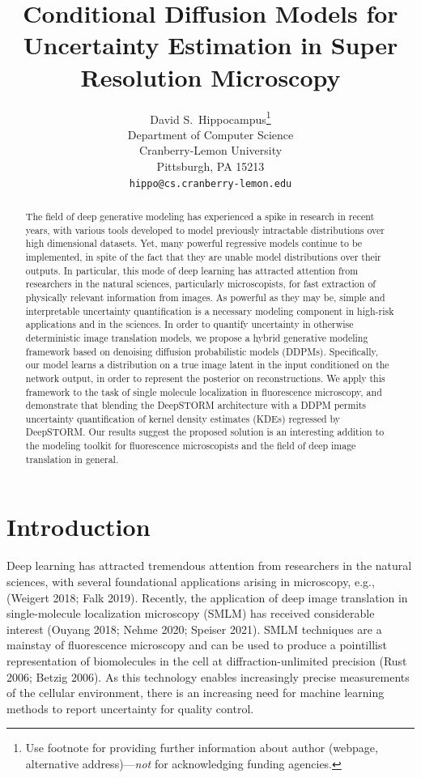 \documentclass{article}
\title{Conditional Diffusion Models for Uncertainty Estimation in Super Resolution Microscopy}
\author{%
  David S.~Hippocampus\thanks{Use footnote for providing further information
    about author (webpage, alternative address)---\emph{not} for acknowledging
    funding agencies.} \\
  Department of Computer Science\\
  Cranberry-Lemon University\\
  Pittsburgh, PA 15213 \\
  \texttt{hippo@cs.cranberry-lemon.edu} \\
}
\begin{document}
\maketitle


\begin{abstract}

The field of deep generative modeling has experienced a spike in research in recent years, with various tools developed to model previously intractable distributions over high dimensional datasets. Yet, many powerful regressive models continue to be implemented, in spite of the fact that they are unable model distributions over their outputs. In particular, this mode of deep learning has attracted attention from researchers in the natural sciences, particularly microscopists, for fast extraction of physically relevant information from images. As powerful as they may be, simple and interpretable uncertainty quantification is a necessary modeling component in high-risk applications and in the sciences. In order to quantify uncertainty in otherwise deterministic image translation models, we propose a hybrid generative modeling framework based on denoising diffusion probabilistic models (DDPMs). Specifically, our model learns a distribution on a true image latent in the input conditioned on the network output, in order to represent the posterior on reconstructions. We apply this framework to the task of single molecule localization in fluorescence microscopy, and demonstrate that blending the DeepSTORM architecture with a DDPM permits uncertainty quantification of kernel density estimates (KDEs) regressed by DeepSTORM. Our results suggest the proposed solution is an interesting addition to the modeling toolkit for fluorescence microscopists and the field of deep image translation in general.
\end{abstract}

\section{Introduction}

Deep learning has attracted tremendous attention from researchers in the natural sciences, with several foundational applications arising in microscopy, e.g., (Weigert 2018; Falk 2019). Recently, the application of deep image translation in single-molecule localization microscopy (SMLM) has received considerable interest (Ouyang 2018; Nehme 2020; Speiser 2021). SMLM techniques are a mainstay of fluorescence microscopy and can be used to produce a pointillist representation of biomolecules in the cell at diffraction-unlimited precision (Rust 2006; Betzig 2006). As this technology enables increasingly precise measurements of the cellular environment, there is an increasing need for machine learning methods to report uncertainty for quality control.  
\end{document}
